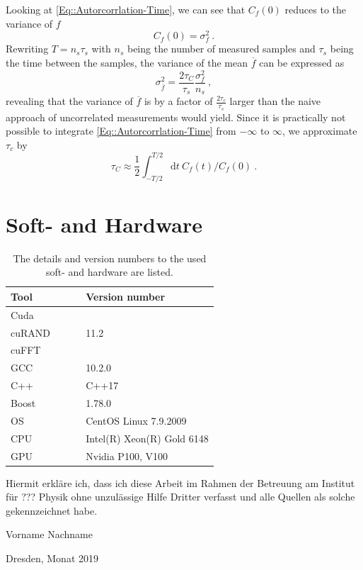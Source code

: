 	Looking at \autoref{Eq::Autorcorrlation-Time}, we can see that $C_f(0)$ reduces to the variance of $f$
	\begin{equation}
		C_f(0) =	\sigma_f^2~.
	\end{equation}
	Rewriting $T =	n_s \tau_s$ with $n_s$ being the number of measured samples and $\tau_s$ being the time between the samples, the variance of the mean $\overline{f}$ can be expressed as
	\begin{equation}
		\sigma_{\overline{f}}^2 =	\frac{2 \tau_C}{\tau_s} \frac{\sigma_f^2}{n_s} ~,
	\end{equation}
	revealing that the variance of $\overline{f}$ is by a factor of $\frac{2 \tau_c}{\tau_s}$ larger than the naive approach of uncorrelated measurements would yield. Since it is practically not possible to integrate \autoref{Eq::Autorcorrlation-Time} from $-\infty$ to $\infty$,   we approximate $\tau_c$ by
	\begin{equation}
		\tau_C \approx \frac{1}{2} \int_{-T/2}^{T/2} \text{d}t~C_f(t) /	C_f(0)~.
	\end{equation}

	\section{Soft- and Hardware}
	\begin{table}[h]
		\centering
		\caption{The details and version numbers to the used soft- and hardware are listed.}
		\renewcommand{\arraystretch}{1.7}
		\begin{tabular}{l l }
			\toprule
			Tool $\qquad \qquad $& Version number \\
			\midrule
			Cuda &  $~$\\
			cuRAND & 11.2 \\
			cuFFT & $~$\\
			\midrule
			GCC & 10.2.0 \\
			C++ & C++17 \\
			Boost & 1.78.0 \\					
			\midrule
			OS & CentOS Linux 7.9.2009 \\
			CPU & Intel(R) Xeon(R) Gold 6148 \\
			GPU & Nvidia P100, V100 \\
			\bottomrule
		\end{tabular}
		\label{Table::QBM-vs-BM}
	\end{table}

	
	
	
	
	\clearpage
	\thispagestyle{empty}
	\vspace*{1.5em}
	
	Hiermit erkläre ich, dass ich diese Arbeit im Rahmen der Betreuung am Institut
	für ??? Physik ohne unzulässige Hilfe Dritter verfasst und alle Quellen als solche gekennzeichnet habe.
	
	\vspace*{45em}
	
	Vorname Nachname \par
	Dresden, Monat 2019
	

